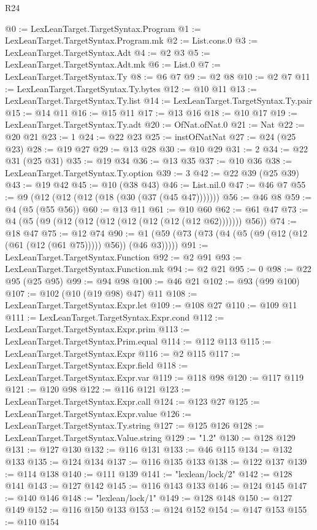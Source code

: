 \begin{lexlean}{R24}
\begin{coremodule}
{{{{{{{{{{{{{{{{{{{{{{{{{{{{{{{{{{{{{{{{{{{{{{{{{{{{{{{{{{{{{{{{{{{{{{{{{{{{{{{{{{{{{{{{{{{{{{{{{{{{{{{{{{{{{{{{{{{{{{{{{{{{{{{{{{{{{{{{{{{{{{{{{{{{{{{{{{{{{{{{{{{{{{{{{{{{{{{{{{{{{{{{{{{{{{{{{{{@0 := LexLeanTarget.TargetSyntax.Program
@1 := LexLeanTarget.TargetSyntax.Program.mk
@2 := List.cons.{0}
@3 := LexLeanTarget.TargetSyntax.Adt
@4 := @2 @3
@5 := LexLeanTarget.TargetSyntax.Adt.mk
@6 := List.{0}
@7 := LexLeanTarget.TargetSyntax.Ty
@8 := @6 @7
@9 := @2 @8
@10 := @2 @7
@11 := LexLeanTarget.TargetSyntax.Ty.bytes
@12 := @10 @11
@13 := LexLeanTarget.TargetSyntax.Ty.list
@14 := LexLeanTarget.TargetSyntax.Ty.pair
@15 := @14 @11
@16 := @15 @11
@17 := @13 @16
@18 := @10 @17
@19 := LexLeanTarget.TargetSyntax.Ty.adt
@20 := OfNat.ofNat.{0}
@21 := Nat
@22 := @20 @21
@23 := 1
@24 := @22 @23
@25 := instOfNatNat
@27 := @24 (@25 @23)
@28 := @19 @27
@29 := @13 @28
@30 := @10 @29
@31 := 2
@34 := @22 @31 (@25 @31)
@35 := @19 @34
@36 := @13 @35
@37 := @10 @36
@38 := LexLeanTarget.TargetSyntax.Ty.option
@39 := 3
@42 := @22 @39 (@25 @39)
@43 := @19 @42
@45 := @10 (@38 @43)
@46 := List.nil.{0}
@47 := @46 @7
@55 := @9 (@12 (@12 (@12 (@18 (@30 (@37 (@45 @47)))))))
@56 := @46 @8
@59 := @4 (@5 (@55 @56))
@60 := @13 @11
@61 := @10 @60
@62 := @61 @47
@73 := @4 (@5 (@9 (@12 (@12 (@12 (@12 (@12 (@12 (@12 @62))))))) @56))
@74 := @18 @47
@75 := @12 @74
@90 := @1 (@59 (@73 (@73 (@4 (@5 (@9 (@12 (@12 (@61 (@12 (@61 @75))))) @56)) (@46 @3)))))
@91 := LexLeanTarget.TargetSyntax.Function
@92 := @2 @91
@93 := LexLeanTarget.TargetSyntax.Function.mk
@94 := @2 @21
@95 := 0
@98 := @22 @95 (@25 @95)
@99 := @94 @98
@100 := @46 @21
@102 := @93 (@99 @100)
@107 := @102 (@10 (@19 @98) @47) @11
@108 := LexLeanTarget.TargetSyntax.Expr.let
@109 := @108 @27
@110 := @109 @11
@111 := LexLeanTarget.TargetSyntax.Expr.cond
@112 := LexLeanTarget.TargetSyntax.Expr.prim
@113 := LexLeanTarget.TargetSyntax.Prim.equal
@114 := @112 @113
@115 := LexLeanTarget.TargetSyntax.Expr
@116 := @2 @115
@117 := LexLeanTarget.TargetSyntax.Expr.field
@118 := LexLeanTarget.TargetSyntax.Expr.var
@119 := @118 @98
@120 := @117 @119
@121 := @120 @98
@122 := @116 @121
@123 := LexLeanTarget.TargetSyntax.Expr.call
@124 := @123 @27
@125 := LexLeanTarget.TargetSyntax.Expr.value
@126 := LexLeanTarget.TargetSyntax.Ty.string
@127 := @125 @126
@128 := LexLeanTarget.TargetSyntax.Value.string
@129 := "1.2"
@130 := @128 @129
@131 := @127 @130
@132 := @116 @131
@133 := @46 @115
@134 := @132 @133
@135 := @124 @134
@137 := @116 @135 @133
@138 := @122 @137
@139 := @114 @138
@140 := @111 @139
@141 := "lexlean/lock/2"
@142 := @128 @141
@143 := @127 @142
@145 := @116 @143 @133
@146 := @124 @145
@147 := @140 @146
@148 := "lexlean/lock/1"
@149 := @128 @148
@150 := @127 @149
@152 := @116 @150 @133
@153 := @124 @152
@154 := @147 @153
@155 := @110 @154
}}}}}}}}}}}}}}}}}}}}}}}}}}}}}}}}}}}}}}}}}}}}}}}}}}}}}}}}}}}}}}}}}}}}}}}}}}}}}}}}}}}}}}}}}}}}}}}}}}}}}}}}}}}}}}}}}}}}}}}}}}}}}}}}}}}}}}}}}}}}}}}}}}}}}}}}}}}}}}}}}}}}}}}}}}}}}}}}}}}}}}}}}}}}}}}}}}}
\end{coremodule}
\end{lexlean}
